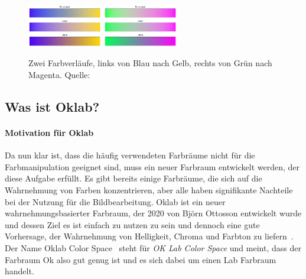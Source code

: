 \documentclass[12pt, a4paper, ngerman]{article}
\begin{document}
\begin{figure}
  \centering
  \includegraphics[width=0.29\textwidth]{Grafiken/Farbverlauf/blueyellow.png}
  \includegraphics[width=0.29\textwidth]{Grafiken/Farbverlauf/greenmagenta.png}
  \caption{Zwei Farbverläufe, links von Blau nach Gelb, rechts von Grün nach Magenta. Quelle:~\cite{Ottosson_2020}}
  \label{fig:vergleich_zweifarbig}
\end{figure}

\subsection{Was ist Oklab?}

\paragraph{Motivation für Oklab}
Da nun klar ist, dass die häufig verwendeten Farbräume nicht für die Farbmanipulation geeignet sind, 
muss ein neuer Farbraum entwickelt werden, der diese Aufgabe erfüllt.
Es gibt bereits einige Farbräume, die sich auf die Wahrnehmung von Farben konzentrieren, 
aber alle haben signifikante Nachteile bei der Nutzung für die Bildbearbeitung.
\acs{Oklab} ist ein neuer wahrnehmungsbasierter Farbraum, der 2020 von Björn Ottosson entwickelt wurde und 
dessen Ziel es ist einfach zu nutzen zu sein und dennoch eine gute Vorhersage, 
der  Wahrnehmung von Helligkeit, Chroma und Farbton zu liefern~\cite{Oklab_2020}.
Der Name \glqq Oklab Color Space\grqq~ steht für \emph{OK Lab Color Space} und meint, 
dass der Farbraum Ok also gut genug ist und es sich dabei um einen Lab Farbraum handelt.
\end{document}
